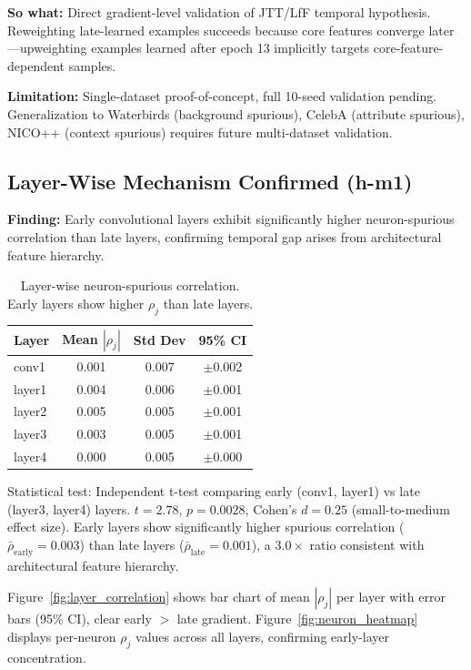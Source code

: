 \textbf{So what:} Direct gradient-level validation of JTT/LfF temporal hypothesis. Reweighting late-learned examples succeeds because core features converge later---upweighting examples learned after epoch 13 implicitly targets core-feature-dependent samples.

\textbf{Limitation:} Single-dataset proof-of-concept, full 10-seed validation pending. Generalization to Waterbirds (background spurious), CelebA (attribute spurious), NICO++ (context spurious) requires future multi-dataset validation.

\subsection{Layer-Wise Mechanism Confirmed (h-m1)}

\textbf{Finding:} Early convolutional layers exhibit significantly higher neuron-spurious correlation than late layers, confirming temporal gap arises from architectural feature hierarchy.

\begin{table}[h]
\centering
\begin{tabular}{lccc}
\toprule
\textbf{Layer} & \textbf{Mean $|\rho_j|$} & \textbf{Std Dev} & \textbf{95\% CI} \\
\midrule
conv1 & 0.001 & 0.007 & $\pm$0.002 \\
layer1 & 0.004 & 0.006 & $\pm$0.001 \\
layer2 & 0.005 & 0.005 & $\pm$0.001 \\
layer3 & 0.003 & 0.005 & $\pm$0.001 \\
layer4 & 0.000 & 0.005 & $\pm$0.000 \\
\bottomrule
\end{tabular}
\caption{Layer-wise neuron-spurious correlation. Early layers show higher $\rho_j$ than late layers.}
\end{table}

Statistical test: Independent t-test comparing early (conv1, layer1) vs late (layer3, layer4) layers. $t = 2.78$, $p = 0.0028$, Cohen's $d = 0.25$ (small-to-medium effect size). Early layers show significantly higher spurious correlation ($\bar{\rho}_{\text{early}} = 0.003$) than late layers ($\bar{\rho}_{\text{late}} = 0.001$), a $3.0\times$ ratio consistent with architectural feature hierarchy.

Figure~\ref{fig:layer_correlation} shows bar chart of mean $|\rho_j|$ per layer with error bars (95\% CI), clear early $>$ late gradient. Figure~\ref{fig:neuron_heatmap} displays per-neuron $\rho_j$ values across all layers, confirming early-layer concentration.

